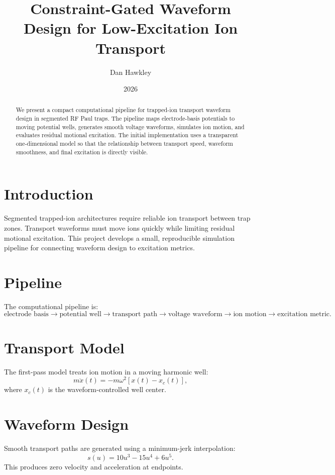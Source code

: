 \documentclass[11pt]{article}
\title{Constraint-Gated Waveform Design for Low-Excitation Ion Transport}
\author{Dan Hawkley}
\date{2026}
\begin{document}
\maketitle

\begin{abstract}
We present a compact computational pipeline for trapped-ion transport waveform design in segmented RF Paul traps. The pipeline maps electrode-basis potentials to moving potential wells, generates smooth voltage waveforms, simulates ion motion, and evaluates residual motional excitation. The initial implementation uses a transparent one-dimensional model so that the relationship between transport speed, waveform smoothness, and final excitation is directly visible.
\end{abstract}

\section{Introduction}

Segmented trapped-ion architectures require reliable ion transport between trap zones. Transport waveforms must move ions quickly while limiting residual motional excitation. This project develops a small, reproducible simulation pipeline for connecting waveform design to excitation metrics.

\section{Pipeline}

The computational pipeline is:
\[
\text{electrode basis}
\rightarrow
\text{potential well}
\rightarrow
\text{transport path}
\rightarrow
\text{voltage waveform}
\rightarrow
\text{ion motion}
\rightarrow
\text{excitation metric}.
\]

\section{Transport Model}

The first-pass model treats ion motion in a moving harmonic well:
\[
m\ddot{x}(t) = -m\omega^2[x(t)-x_c(t)],
\]
where \(x_c(t)\) is the waveform-controlled well center.

\section{Waveform Design}

Smooth transport paths are generated using a minimum-jerk interpolation:
\[
s(u)=10u^3-15u^4+6u^5.
\]
This produces zero velocity and acceleration at endpoints.
\end{document}
